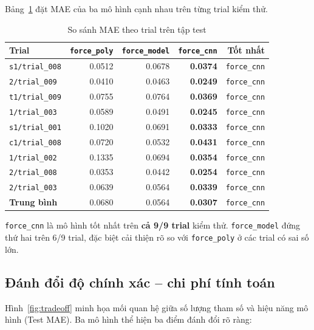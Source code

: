 Bảng~\ref{tab:mae_comparison} đặt MAE của ba mô hình cạnh nhau trên từng
trial kiểm thử.

\begin{table}[h]
\centering
\caption{So sánh MAE theo trial trên tập test}
\label{tab:mae_comparison}
\begin{tabular}{lrrrr}
\toprule
\textbf{Trial} & \textbf{\texttt{force\_poly}} & \textbf{\texttt{force\_model}}
  & \textbf{\texttt{force\_cnn}} & \textbf{Tốt nhất} \\
\midrule
\texttt{s1/trial\_008} & 0.0512 & 0.0678 & \textbf{0.0374} & \texttt{force\_cnn} \\
\texttt{2/trial\_009}  & 0.0410 & 0.0463 & \textbf{0.0249} & \texttt{force\_cnn} \\
\texttt{t1/trial\_009} & 0.0755 & 0.0764 & \textbf{0.0369} & \texttt{force\_cnn} \\
\texttt{1/trial\_003}  & 0.0589 & 0.0491 & \textbf{0.0245} & \texttt{force\_cnn} \\
\texttt{s1/trial\_001} & 0.1020 & 0.0691 & \textbf{0.0333} & \texttt{force\_cnn} \\
\texttt{c1/trial\_008} & 0.0720 & 0.0532 & \textbf{0.0431} & \texttt{force\_cnn} \\
\texttt{1/trial\_002}  & 0.1335 & 0.0694 & \textbf{0.0354} & \texttt{force\_cnn} \\
\texttt{2/trial\_008}  & 0.0353 & 0.0442 & \textbf{0.0254} & \texttt{force\_cnn} \\
\texttt{2/trial\_003}  & 0.0639 & 0.0564 & \textbf{0.0339} & \texttt{force\_cnn} \\
\midrule
\textbf{Trung bình} & 0.0680 & 0.0564 & \textbf{0.0307} & \texttt{force\_cnn} \\
\bottomrule
\end{tabular}
\end{table}

\texttt{force\_cnn} là mô hình tốt nhất trên \textbf{cả 9/9 trial} kiểm thử.
\texttt{force\_model} đứng thứ hai trên 6/9 trial, đặc biệt cải thiện rõ so
với \texttt{force\_poly} ở các trial có sai số lớn.

\subsection{Đánh đổi độ chính xác -- chi phí tính toán}

Hình~\ref{fig:tradeoff} minh họa mối quan hệ giữa số lượng tham số và hiệu
năng mô hình (Test MAE). Ba mô hình thể hiện ba điểm đánh đổi rõ ràng:

